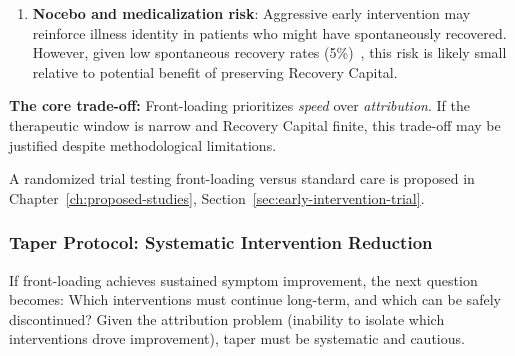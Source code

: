 \begin{warning}
\begin{enumerate}
    \item \textbf{Nocebo and medicalization risk}: Aggressive early intervention may reinforce illness identity in patients who might have spontaneously recovered. However, given low spontaneous recovery rates (5\%)~\cite{Cairns2005prognosis}, this risk is likely small relative to potential benefit of preserving Recovery Capital.
\end{enumerate}

\textbf{The core trade-off:} Front-loading prioritizes \emph{speed} over \emph{attribution}. If the therapeutic window is narrow and Recovery Capital finite, this trade-off may be justified despite methodological limitations.

A randomized trial testing front-loading versus standard care is proposed in Chapter~\ref{ch:proposed-studies}, Section~\ref{sec:early-intervention-trial}.
\end{warning}

\subsubsection{Taper Protocol: Systematic Intervention Reduction}
\label{subsubsec:taper-protocol}

If front-loading achieves sustained symptom improvement, the next question becomes: Which interventions must continue long-term, and which can be safely discontinued? Given the attribution problem (inability to isolate which interventions drove improvement), taper must be systematic and cautious.

